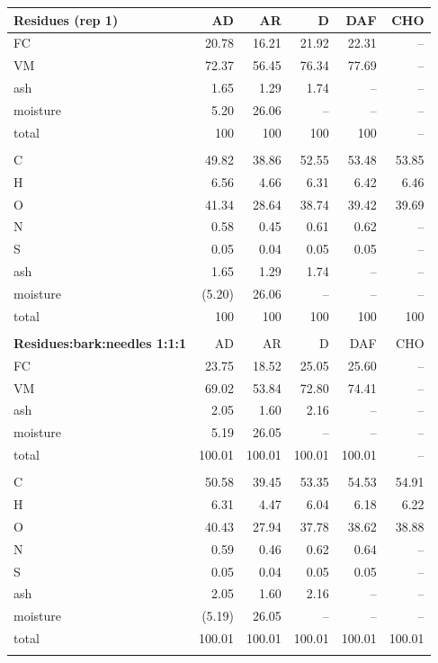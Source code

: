 \begin{center}
\begin{longtable}{lrrrrr}
    \textbf{Residues (rep 1)} & AD & AR & D & DAF & CHO \\
    \midrule
    FC       & 20.78  & 16.21  & 21.92  & 22.31  & -- \\
    VM       & 72.37  & 56.45  & 76.34  & 77.69  & -- \\
    ash      & 1.65   & 1.29   & 1.74   & --     & -- \\
    moisture & 5.20   & 26.06  & --     & --     & -- \\
    total    & 100    & 100    & 100    & 100    & -- \\
    \\
    C        & 49.82  & 38.86  & 52.55  & 53.48  & 53.85 \\
    H        & 6.56   & 4.66   & 6.31   & 6.42   & 6.46 \\
    O        & 41.34  & 28.64  & 38.74  & 39.42  & 39.69 \\
    N        & 0.58   & 0.45   & 0.61   & 0.62   & -- \\
    S        & 0.05   & 0.04   & 0.05   & 0.05   & -- \\
    ash      & 1.65   & 1.29   & 1.74   & --     & -- \\
    moisture & (5.20) & 26.06  & --     & --     & -- \\
    total    & 100    & 100    & 100    & 100    & 100 \\
    \\

    \textbf{Residues:bark:needles 1:1:1} & AD & AR & D & DAF & CHO \\
    \midrule
    FC       & 23.75  & 18.52  & 25.05  & 25.60  & -- \\
    VM       & 69.02  & 53.84  & 72.80  & 74.41  & -- \\
    ash      & 2.05   & 1.60   & 2.16   & --     & -- \\
    moisture & 5.19   & 26.05  & --     & --     & -- \\
    total    & 100.01 & 100.01 & 100.01 & 100.01 & -- \\
    \\
    C        & 50.58  & 39.45  & 53.35  & 54.53  & 54.91 \\
    H        & 6.31   & 4.47   & 6.04   & 6.18   & 6.22 \\
    O        & 40.43  & 27.94  & 37.78  & 38.62  & 38.88 \\
    N        & 0.59   & 0.46   & 0.62   & 0.64   & -- \\
    S        & 0.05   & 0.04   & 0.05   & 0.05   & -- \\
    ash      & 2.05   & 1.60   & 2.16   & --     & -- \\
    moisture & (5.19) & 26.05  & --     & --     & -- \\
    total    & 100.01 & 100.01 & 100.01 & 100.01 & 100.01 \\
    \\


\end{longtable}
\end{center}
